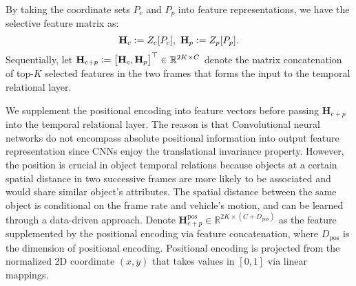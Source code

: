 \documentclass[10pt,twocolumn,letterpaper]{article}
\newcommand{\RR}{\mathbb{R}}
\newcommand{\defeq}{\vcentcolon=}
\begin{document}
By taking the coordinate sets $P_c$ and $P_p$ into feature representations, we have the selective feature matrix as:
\begin{equation}
    \textbf{H}_c \defeq Z_c[P_c],\ \textbf{H}_p \defeq Z_p[P_p].
\end{equation}
Sequentially, let $\textbf{H}_{c+p} \defeq \begin{bmatrix} \textbf{H}_{c},\textbf{H}_p\\ \end{bmatrix}^\top\in\RR^{2K\times C}$ denote the matrix concatenation of top-$K$ selected features in the two frames that forms the input to the temporal relational layer.

We supplement the positional encoding into feature vectors before passing $\textbf{H}_{c+p}$ into the temporal relational layer. The reason is that Convolutional neural networks do not encompass absolute positional information into output feature representation since CNNs enjoy the translational invariance property. However, the position is crucial in object temporal relations because objects at a certain spatial distance in two successive frames are more likely to be associated and would share similar object's attributes. The spatial distance between the same object is conditional on the frame rate and vehicle's motion, and can be learned through a data-driven approach. Denote $\textbf{H}_{c+p}^{\text{pos}}\in\RR^{2K\times (C+D_\text{pos})}$ as the feature supplemented by the positional encoding via feature concatenation, where $D_\text{pos}$ is the dimension of positional encoding. Positional encoding is projected from the normalized 2D coordinate $(x, y)$ that takes values in $[0,1]$ via linear mappings.
\end{document}
